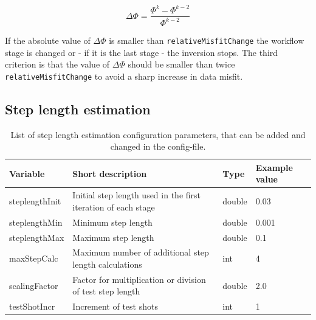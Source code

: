 \documentclass[pdftex,a4paper,parskip,listof=totoc,bibliography=totoc,onehalfspacing,12pt]{scrreprt}
\begin{document}
\begin{equation*}
 \Delta \Phi = \frac{\Phi^k-\Phi^{k-2}}{\Phi^{k-2}}
\end{equation*}

If the absolute value of $\Delta \Phi$ is smaller than \verb+relativeMisfitChange+ the workflow stage is changed or - if it is the last stage - the inversion stops. The third criterion is that the value of $\Delta \Phi$ should be smaller than twice \verb+relativeMisfitChange+ to avoid a sharp increase in data misfit.

\subsection{Step length estimation}
\begin{table}[h!]
\caption[List of step length estimation configuration parameters.]{List of step length estimation configuration parameters, that can be added and changed in the config-file.}\label{tab:config_steplength}
\centering
\begin{adjustbox}{width=1\textwidth,center=\textwidth}
	\begin{tabular}{llll}
	\toprule
         Variable                 & Short description                                                   & Type   & Example value \\
	\midrule
         steplengthInit           & Initial step length used in the first iteration of each stage       & double & 0.03  \\
         steplengthMin            & Minimum step length                                                 & double & 0.001 \\
         steplengthMax            & Maximum step length                                                 & double & 0.1 \\                     
         maxStepCalc              & Maximum number of additional step length calculations               &  int   & 4 \\                         
         scalingFactor            & Factor for multiplication or division of test step length           & double & 2.0 \\                                            
         testShotIncr             & Increment of test shots                                             &  int   & 1 \\                       
	\bottomrule
	\end{tabular}
	\end{adjustbox}
\end{table}
\end{document}
